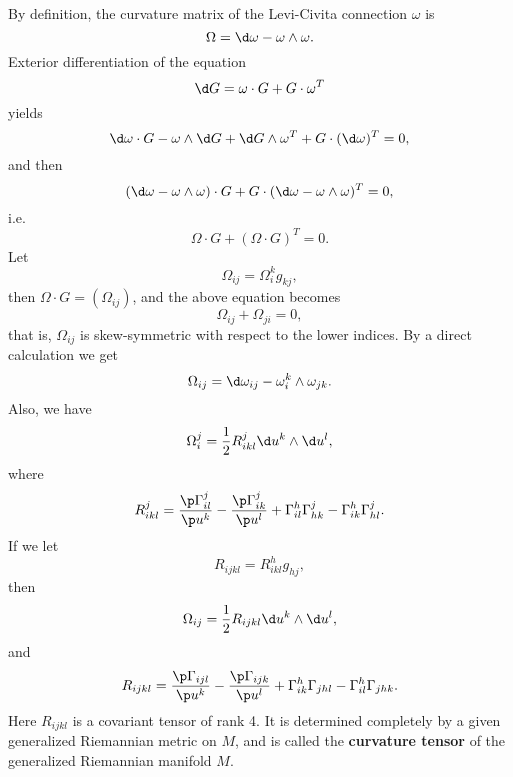 \documentclass[11pt]{article}
\begin{document}
By definition, the curvature matrix of the Levi-Civita connection $\omega$ is $$\Omega = \d\omega - \omega \wedge \omega.$$ Exterior differentiation of the equation $$\d G = \omega \cdot G + G \cdot \omega^T$$ yields $$\d\omega \cdot G - \omega \wedge \d G + \d G \wedge \omega^T + G \cdot (\d\omega)^T = 0,$$ and then $$(\d\omega - \omega \wedge \omega) \cdot G + G \cdot (\d\omega - \omega \wedge \omega)^T = 0,$$ i.e. $$\Omega \cdot G + (\Omega \cdot G)^T = 0.$$ Let $$\Omega_{ij} = \Omega^k_ig_{kj},$$ then $\Omega \cdot G = (\Omega_{ij})$, and the above equation becomes $$\Omega_{ij} + \Omega_{ji} = 0,$$ that is, $\Omega_{ij}$ is skew-symmetric with respect to the lower indices. By a direct calculation we get $$\Omega_{ij} = \d\omega_{ij} - \omega^k_i \wedge \omega_{jk}.$$ Also, we have $$\Omega^j_i = \frac{1}{2}R^j_{ikl}\d u^k \wedge \d u^l,$$ where $$R^j_{ikl} = \frac{\p\Gamma^j_{il}}{\p u^k} - \frac{\p\Gamma^j_{ik}}{\p u^l} + \Gamma^h_{il}\Gamma^j_{hk} - \Gamma^h_{ik}\Gamma^j_{hl}.$$ If we let $$R_{ijkl} = R^h_{ikl}g_{hj},$$ then $$\Omega_{ij} = \frac{1}{2}R_{ijkl}\d u^k \wedge \d u^l,$$ and $$R_{ijkl} = \frac{\p\Gamma_{ijl}}{\p u^k} - \frac{\p\Gamma_{ijk}}{\p u^l} + \Gamma^h_{ik}\Gamma_{jhl} - \Gamma^h_{il}\Gamma_{jhk}.$$ Here $R_{ijkl}$ is a covariant tensor of rank 4. It is determined completely by a given generalized Riemannian metric on $M$, and is called the \textbf{curvature tensor} of the generalized Riemannian manifold $M$. 
\end{document}
